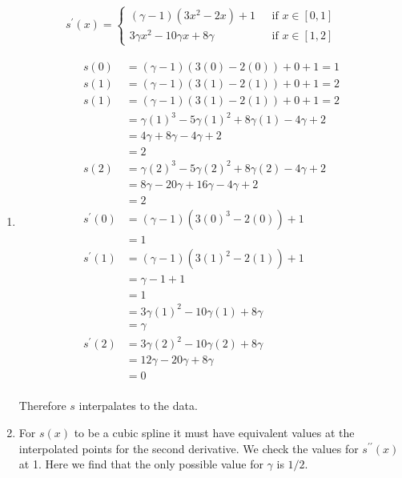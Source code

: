 {\color{blue}

\[
\begin{aligned}
s^\prime(x) = \left\{
\begin{aligned}
(\gamma - 1)(3 x^2 - 2x) + 1 &\,\,\,\, \text{if}\,\, x\in [0,1] \\
3 \gamma x^2 - 10 \gamma x + 8 \gamma &\,\,\,\, \text{if}\,\, x\in [1,2]
\end{aligned}
\right.
\end{aligned}
\]

\begin{enumerate}
\item
\begin{align*}
s(0) &= (\gamma - 1)(3(0) - 2(0)) + 0 + 1 = 1 \\
s(1) &= (\gamma - 1)(3(1) - 2(1)) + 0 + 1 = 2 \\
s(1) &= (\gamma - 1)(3(1) - 2(1)) + 0 + 1 = 2 \\
     &= \gamma (1)^3 - 5 \gamma (1)^2 + 8 \gamma (1) - 4 \gamma + 2\\
     &= 4 \gamma + 8 \gamma - 4 \gamma + 2 \\
     &= 2 \\
s(2) &= \gamma (2)^3 - 5 \gamma (2)^2 + 8 \gamma (2) - 4 \gamma + 2\\
     &= 8 \gamma - 20 \gamma + 16 \gamma - 4\gamma + 2\\
     &= 2 \\
s^\prime(0) &= (\gamma - 1)(3 (0)^3 - 2(0)) + 1 \\
           &= 1 \\
s^\prime(1) &= (\gamma - 1)(3 (1)^2 - 2(1)) + 1 \\
           &= \gamma - 1 + 1 \\
           &= 1 \\
           &= 3 \gamma (1)^2 - 10 \gamma (1) + 8 \gamma \\
           &= \gamma \\
s^\prime(2) &= 3 \gamma (2)^2 - 10 \gamma (2) + 8 \gamma \\
           &= 12 \gamma - 20 \gamma + 8 \gamma \\
           &= 0 \\
\end{align*}

Therefore $s$ interpalates to the data.

\item

For $s(x)$ to be a cubic spline it must have equivalent values at the
interpolated points for the second derivative. We check the values for
$s^{\prime\prime}(x)$ at 1. Here we find that the only possible value
for $\gamma$ is $1/2$.


\end{enumerate}}
